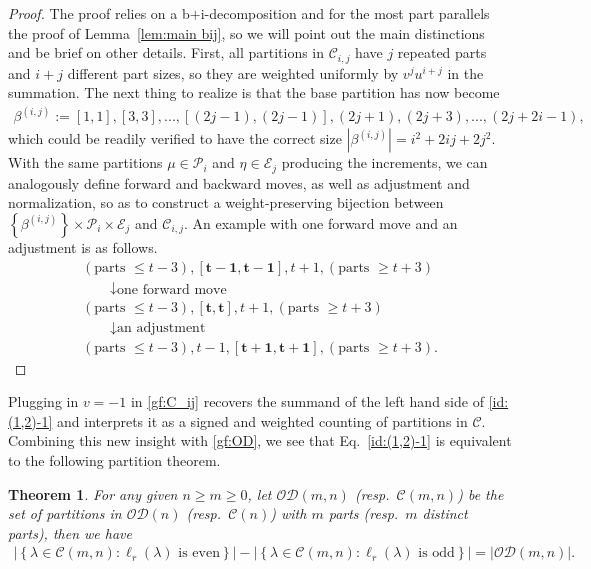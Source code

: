 \documentclass[11pt,reqno]{amsart}
\numberwithin{equation}{section}
\theoremstyle{plain}
\newtheorem{theorem}{Theorem}[section]
\theoremstyle{definition}
\newcommand{\set}[1]{\left\{#1\right\}}
\def\E{\mathcal{E}}
\def\la{\lambda}
\def\C{\mathcal{C}}
\def\O{\mathcal{O}}
\newcommand{\D}{\mathcal{D}}
\renewcommand{\P}{\mathcal{P}}
\begin{document}
\begin{proof}
The proof relies on a b$+$i-decomposition and for the most part parallels the proof of Lemma~\ref{lem:main bij}, so we will point out the main distinctions and be brief on other details. First, all partitions in $\C_{i,j}$ have $j$ repeated parts and $i+j$ different part sizes, so they are weighted uniformly by $v^ju^{i+j}$ in the summation. The next thing to realize is that the base partition has now become
\begin{align*}
\beta^{(i, j)}:=[1, 1], [3, 3], ..., [(2j-1), (2j-1)], (2j+1), (2j+3), ..., (2j+2i-1),
\end{align*}
which could be readily verified to have the correct size $|\beta^{(i, j)}|=i^2+2ij+2j^2$. With the same partitions $\mu\in\P_i$ and $\eta\in\E_j$ producing the increments, we can analogously define forward and backward moves, as well as adjustment and normalization, so as to construct a weight-preserving bijection between $\set{\beta^{(i,j)}}\times\P_i\times\E_j$ and $\C_{i,j}$. An example with one forward move and an adjustment is as follows.
  $$
  \begin{gathered}
  (\text{parts $\leq t-3$}), [ \mathbf{t-1}, \mathbf{t-1}], t+1, (\text{parts $\geq t+3$}) \\
  \qquad \downarrow \text {one forward move } \\
  (\text{parts $\leq t-3$}), [\mathbf{t}, \mathbf{t}], t+1, (\text{parts $\geq t+3$})\\
  \qquad \downarrow \text {an adjustment} \\
  (\text{parts $\leq t-3$}), t-1, [\mathbf{t+1}, \mathbf{t+1}], (\text{parts $\geq t+3$}).
  \end{gathered}
  $$
\end{proof}
Plugging in $v=-1$ in \eqref{gf:C_ij} recovers the summand of the left hand side of \eqref{id:(1,2)-1} and interprets it as a signed and weighted counting of partitions in $\C$. Combining this new insight with \eqref{gf:OD}, we see that Eq.~\eqref{id:(1,2)-1} is equivalent to the following partition theorem.

\begin{theorem}\label{thm:Lovejoy}
For any given $n\ge m\ge 0$, let $\O\D(m,n)$ (resp.~$\C(m,n)$) be the set of partitions in $\O\D(n)$ (resp.~$\C(n)$) with $m$ parts (resp.~$m$ distinct parts), then we have
\begin{align*}
|\set{\la\in\C(m,n): \ell_r(\la) \text{ is even}}|-|\set{\la\in\C(m,n): \ell_r(\la) \text{ is odd}}|=|\O\D(m,n)|.
\end{align*}
\end{theorem}
\end{document}
